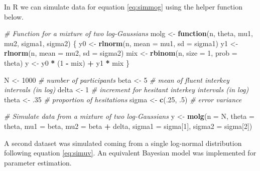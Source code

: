 \documentclass[
  man,floatsintext]{apa7}
\newenvironment{Shaded}{\begin{snugshade}}{\end{snugshade}}
\newcommand{\AttributeTok}[1]{\textcolor[rgb]{0.13,0.29,0.53}{#1}}
\newcommand{\CommentTok}[1]{\textcolor[rgb]{0.56,0.35,0.01}{\textit{#1}}}
\newcommand{\ControlFlowTok}[1]{\textcolor[rgb]{0.13,0.29,0.53}{\textbf{#1}}}
\newcommand{\DecValTok}[1]{\textcolor[rgb]{0.00,0.00,0.81}{#1}}
\newcommand{\FunctionTok}[1]{\textcolor[rgb]{0.13,0.29,0.53}{\textbf{#1}}}
\newcommand{\NormalTok}[1]{#1}
\newcommand{\OtherTok}[1]{\textcolor[rgb]{0.56,0.35,0.01}{#1}}
\newcommand{\SpecialCharTok}[1]{\textcolor[rgb]{0.81,0.36,0.00}{\textbf{#1}}}
\begin{document}
In R we can simulate data for equation \ref{eq:simmog} using the helper function below.

\begin{Shaded}
\begin{Highlighting}[]
\CommentTok{\# Function for a mixture of two log{-}Gaussians}
\NormalTok{molg }\OtherTok{\textless{}{-}} \ControlFlowTok{function}\NormalTok{(n, theta, mu1, mu2, sigma1, sigma2) \{}
\NormalTok{  y0 }\OtherTok{\textless{}{-}} \FunctionTok{rlnorm}\NormalTok{(n, }\AttributeTok{mean =}\NormalTok{ mu1, }\AttributeTok{sd =}\NormalTok{ sigma1)}
\NormalTok{  y1 }\OtherTok{\textless{}{-}} \FunctionTok{rlnorm}\NormalTok{(n, }\AttributeTok{mean =}\NormalTok{ mu2, }\AttributeTok{sd =}\NormalTok{ sigma2)}
\NormalTok{  mix }\OtherTok{\textless{}{-}} \FunctionTok{rbinom}\NormalTok{(n, }\AttributeTok{size =} \DecValTok{1}\NormalTok{, }\AttributeTok{prob =}\NormalTok{ theta)}
\NormalTok{  y }\OtherTok{\textless{}{-}}\NormalTok{ y0 }\SpecialCharTok{*}\NormalTok{ (}\DecValTok{1} \SpecialCharTok{{-}}\NormalTok{ mix) }\SpecialCharTok{+}\NormalTok{ y1 }\SpecialCharTok{*}\NormalTok{ mix }
\NormalTok{\}}

\NormalTok{N }\OtherTok{\textless{}{-}} \DecValTok{1000} \CommentTok{\# number of participants}
\NormalTok{beta }\OtherTok{\textless{}{-}} \DecValTok{5} \CommentTok{\# mean of fluent interkey intervals (in log)}
\NormalTok{delta }\OtherTok{\textless{}{-}} \DecValTok{1} \CommentTok{\# increment for hesitant interkey intervals (in log)}
\NormalTok{theta }\OtherTok{\textless{}{-}}\NormalTok{ .}\DecValTok{35} \CommentTok{\# proportion of hesitations}
\NormalTok{sigma }\OtherTok{\textless{}{-}} \FunctionTok{c}\NormalTok{(.}\DecValTok{25}\NormalTok{, .}\DecValTok{5}\NormalTok{) }\CommentTok{\# error variance}

\CommentTok{\# Simulate data from a mixture of two log{-}Gaussians}
\NormalTok{y }\OtherTok{\textless{}{-}} \FunctionTok{molg}\NormalTok{(}\AttributeTok{n =}\NormalTok{ N, }
          \AttributeTok{theta =}\NormalTok{ theta,}
          \AttributeTok{mu1 =}\NormalTok{ beta,}
          \AttributeTok{mu2 =}\NormalTok{ beta }\SpecialCharTok{+}\NormalTok{ delta,}
          \AttributeTok{sigma1 =}\NormalTok{ sigma[}\DecValTok{1}\NormalTok{],}
          \AttributeTok{sigma2 =}\NormalTok{ sigma[}\DecValTok{2}\NormalTok{])}
\end{Highlighting}
\end{Shaded}

A second dataset was simulated coming from a single log-normal distribution following equation \ref{eq:simuv}. An equivalent Bayesian model was implemented for parameter estimation.
\end{document}
